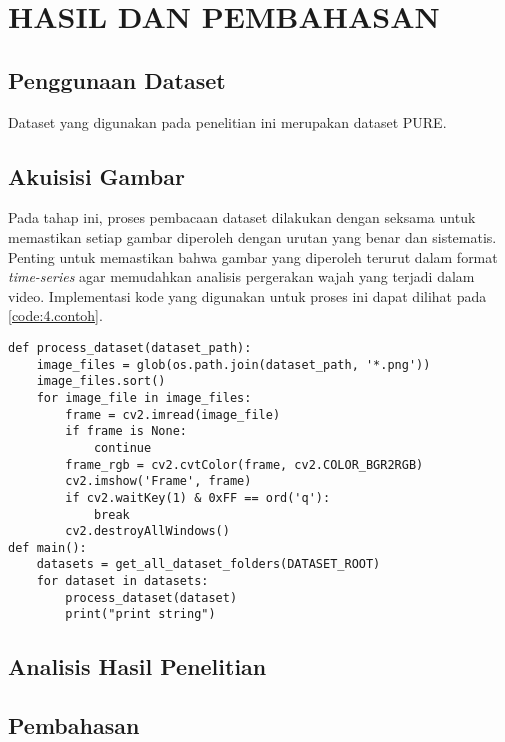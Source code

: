 \newpage
\chapter{HASIL DAN PEMBAHASAN} \label{Bab IV}

\section{Penggunaan Dataset} \label{IV.Penggunaan}
Dataset yang digunakan pada penelitian ini merupakan dataset PURE. 
\lipsum[1-2] %


\section{Akuisisi Gambar} \label{IV.Akuisisi}
Pada tahap ini, proses pembacaan dataset dilakukan dengan seksama untuk memastikan setiap gambar diperoleh dengan urutan yang benar dan sistematis. Penting untuk memastikan bahwa gambar yang diperoleh terurut dalam format \textit{time-series} agar memudahkan analisis pergerakan wajah yang terjadi dalam video. Implementasi kode yang digunakan untuk proses ini dapat dilihat pada \cref{code:4.contoh}. \par

\begin{lstlisting}[caption={Akuisisi Gambar}, label={code:4.contoh}]
def process_dataset(dataset_path):
	image_files = glob(os.path.join(dataset_path, '*.png'))
	image_files.sort()
	for image_file in image_files:
		frame = cv2.imread(image_file)
		if frame is None:
			continue
		frame_rgb = cv2.cvtColor(frame, cv2.COLOR_BGR2RGB)
		cv2.imshow('Frame', frame)
		if cv2.waitKey(1) & 0xFF == ord('q'):
			break
		cv2.destroyAllWindows()
def main():
    datasets = get_all_dataset_folders(DATASET_ROOT)
    for dataset in datasets:
        process_dataset(dataset)
        print("print string")
\end{lstlisting}


\section{Analisis Hasil Penelitian} \label{IV.Analisis}
\lipsum[1-2] %


\section{Pembahasan} \label{IV.Bahas}
\lipsum[1-2] %